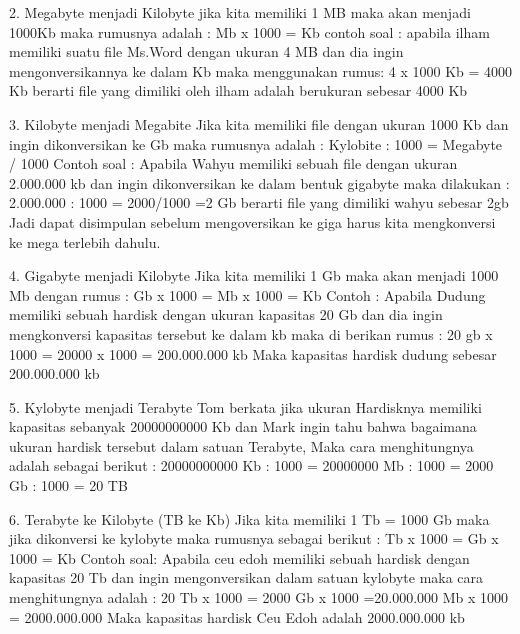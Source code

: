 2. Megabyte menjadi Kilobyte
jika kita memiliki 1 MB maka akan menjadi 1000Kb maka rumusnya adalah :
Mb x 1000 = Kb
contoh soal :
apabila ilham memiliki suatu file Ms.Word dengan ukuran 4 MB dan dia ingin mengonversikannya ke dalam Kb maka menggunakan rumus: 
4 x 1000 Kb = 4000 Kb
berarti file yang dimiliki oleh ilham adalah berukuran sebesar 4000 Kb

3. Kilobyte menjadi Megabite
Jika kita memiliki file dengan ukuran 1000 Kb dan ingin dikonversikan ke Gb maka rumusnya adalah :
Kylobite : 1000 = Megabyte / 1000
Contoh soal :
Apabila Wahyu memiliki sebuah file dengan ukuran 2.000.000 kb dan ingin dikonversikan ke dalam bentuk gigabyte maka dilakukan :
2.000.000 : 1000 = 2000/1000
=2 Gb
berarti file yang dimiliki wahyu sebesar 2gb
Jadi dapat disimpulan sebelum mengoversikan ke giga harus kita mengkonversi ke mega terlebih dahulu.

4.	Gigabyte menjadi Kilobyte
Jika kita memiliki 1 Gb maka akan menjadi 1000 Mb dengan rumus :
Gb x 1000 = Mb x 1000
= Kb
Contoh : 
Apabila Dudung memiliki sebuah hardisk dengan ukuran kapasitas 20 Gb dan dia ingin mengkonversi kapasitas tersebut ke dalam kb maka di berikan rumus :
20 gb x 1000 = 20000 x 1000
= 200.000.000 kb
Maka kapasitas hardisk dudung sebesar 200.000.000 kb

5.	Kylobyte menjadi Terabyte 
Tom berkata jika ukuran Hardisknya memiliki kapasitas sebanyak 20000000000 Kb dan Mark ingin tahu bahwa bagaimana ukuran hardisk tersebut dalam satuan Terabyte, Maka cara menghitungnya adalah sebagai berikut :
20000000000 Kb : 1000 = 20000000 Mb : 1000 = 2000 Gb : 1000 = 20 TB

6.	Terabyte ke Kilobyte (TB ke Kb)
Jika kita memiliki 1 Tb = 1000 Gb maka jika dikonversi ke kylobyte maka rumusnya sebagai berikut :
Tb x 1000 = Gb x 1000 = Kb
Contoh soal:
Apabila ceu edoh memiliki sebuah hardisk dengan kapasitas 20 Tb dan ingin mengonversikan dalam satuan kylobyte maka cara menghitungnya adalah :
20 Tb x 1000 = 2000 Gb x 1000 
=20.000.000 Mb x 1000 = 2000.000.000
Maka kapasitas hardisk Ceu Edoh adalah 2000.000.000 kb

